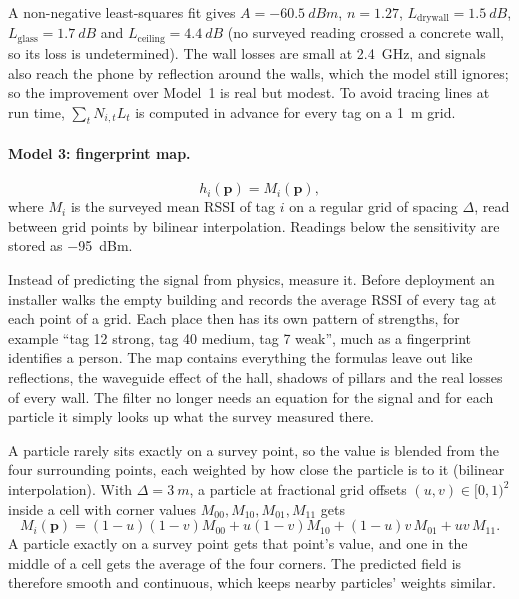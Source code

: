 \documentclass[11pt,a4paper]{article}
\begin{document}
A non-negative least-squares fit gives $A=\SI{-60.5}{dBm}$, $n=1.27$,
$L_\text{drywall}=\SI{1.5}{dB}$, $L_\text{glass}=\SI{1.7}{dB}$ and
$L_\text{ceiling}=\SI{4.4}{dB}$ (no surveyed reading crossed a concrete wall, so its
loss is undetermined). The wall losses are small at \SI{2.4}{GHz}, and signals also
reach the phone by reflection around the walls, which the model still ignores; so the
improvement over Model~1 is real but modest. To avoid tracing lines at run time,
$\sum_t N_{i,t}L_t$ is computed in advance for every tag on a \SI{1}{m} grid.

\paragraph{Model 3: fingerprint map.}
\begin{equation}
  h_i(\mathbf{p}) = M_i(\mathbf{p}),
  \label{eq:fingerprint}
\end{equation}
where $M_i$ is the surveyed mean RSSI of tag $i$ on a regular grid of spacing $\Delta$,
read between grid points by bilinear interpolation. Readings below the sensitivity are
stored as \SI{-95}{dBm}.

Instead of predicting the signal from physics, measure it. Before
deployment an installer walks the empty building and records the average RSSI of every
tag at each point of a grid. Each place then has its own pattern of strengths, for
example ``tag 12 strong, tag 40 medium, tag 7 weak'', much as a fingerprint identifies a
person. The map contains everything the formulas leave out like reflections, the
waveguide effect of the hall, shadows of pillars and the real losses of every wall. The
filter no longer needs an equation for the signal and for each particle it simply looks up
what the survey measured there.

A particle rarely sits exactly on a survey point, so the value is blended from the four
surrounding points, each weighted by how close the particle is to it (bilinear
interpolation). With $\Delta=\SI{3}{m}$, a particle at fractional grid offsets
$(u,v)\in[0,1)^2$ inside a cell with corner values $M_{00},M_{10},M_{01},M_{11}$ gets
\begin{equation}
  M_i(\mathbf{p}) = (1-u)(1-v)M_{00} + u(1-v)M_{10} + (1-u)v\,M_{01} + uv\,M_{11}.
\end{equation}
A particle exactly on a survey point gets that point's value, and one in the middle of a
cell gets the average of the four corners. The predicted field is therefore smooth and
continuous, which keeps nearby particles' weights similar.
\end{document}
